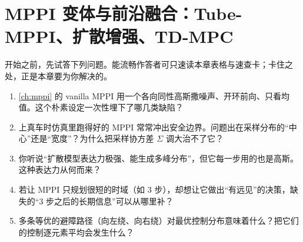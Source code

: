 \chapter{MPPI 变体与前沿融合：Tube-MPPI、扩散增强、TD-MPC}
\label{ch:mppi-variants}


\begin{practice}[前置自测]
开始之前，先试答下列问题。能流畅作答者可只速读本章表格与速查卡；卡住之处，正是本章要为你解决的。
\begin{enumerate}
  \item \cref{ch:mppi} 的 vanilla MPPI 用一个各向同性高斯撒噪声、开环前向、只看均值。这个朴素设定一次性埋下了哪几类缺陷？
  \item 上真车时仿真里跑得好的 MPPI 常常冲出安全边界。问题出在采样分布的“中心”还是“宽度”？为什么把采样协方差 $\Sigma$ 调大治不了它？
  \item 你听说“扩散模型表达力极强、能生成多峰分布”，但它每一步用的也是高斯。这种表达力从何而来？
  \item 若让 MPPI 只规划很短的时域（如 $3$ 步），却想让它做出“有远见”的决策，缺失的“$3$ 步之后的长期信息”可以从哪里补？
  \item 多条等优的避障路径（向左绕、向右绕）对最优控制分布意味着什么？把它们的控制逐元素平均会发生什么？
\end{enumerate}
\end{practice}

